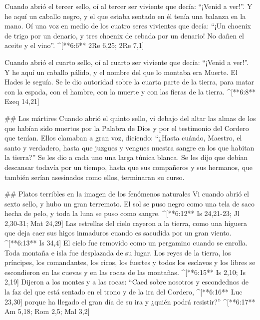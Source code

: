 \begin{paracols}{2}
 Cuando abrió el tercer sello, oí al tercer ser viviente que decía: “¡Venid a ver!”. Y he aquí un caballo negro, y el que estaba sentado en él tenía una balanza en la mano.  Oí una voz en medio de los cuatro seres vivientes que decía: “¡Un choenix de trigo por un denario, y tres choenix de cebada por un denario! No dañen el aceite y el vino”. ^[**6:6** 2Re 6,25; 2Re 7,1]

 Cuando abrió el cuarto sello, oí al cuarto ser viviente que decía: “¡Venid a ver!”.  Y he aquí un caballo pálido, y el nombre del que lo montaba era Muerte. El Hades le seguía. Se le dio autoridad sobre la cuarta parte de la tierra, para matar con la espada, con el hambre, con la muerte y con las fieras de la tierra. ^[**6:8** Ezeq 14,21]

## Los mártires
 Cuando abrió el quinto sello, vi debajo del altar las almas de los que habían sido muertos por la Palabra de Dios y por el testimonio del Cordero que tenían.  Ellos clamaban a gran voz, diciendo: “¿Hasta cuándo, Maestro, el santo y verdadero, hasta que juzgues y vengues nuestra sangre en los que habitan la tierra?”  Se les dio a cada uno una larga túnica blanca. Se les dijo que debían descansar todavía por un tiempo, hasta que sus compañeros y sus hermanos, que también serían asesinados como ellos, terminaran su curso.

## Platos terribles en la imagen de los fenómenos naturales
 Vi cuando abrió el sexto sello, y hubo un gran terremoto. El sol se puso negro como una tela de saco hecha de pelo, y toda la luna se puso como sangre. ^[**6:12** Is 24,21-23; Jl 2,30-31; Mat 24,29]  Las estrellas del cielo cayeron a la tierra, como una higuera que deja caer sus higos inmaduros cuando es sacudida por un gran viento. ^[**6:13** Is 34,4]  El cielo fue removido como un pergamino cuando se enrolla. Toda montaña e isla fue desplazada de su lugar.  Los reyes de la tierra, los príncipes, los comandantes, los ricos, los fuertes y todos los esclavos y los libres se escondieron en las cuevas y en las rocas de las montañas. ^[**6:15** Is 2,10; Is 2,19]  Dijeron a los montes y a las rocas: “Caed sobre nosotros y escondednos de la faz del que está sentado en el trono y de la ira del Cordero, ^[**6:16** Luc 23,30]  porque ha llegado el gran día de su ira y ¿quién podrá resistir?” ^[**6:17** Am 5,18; Rom 2,5; Mal 3,2]


\end{paracols}
